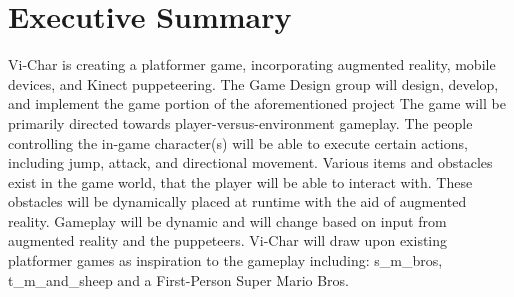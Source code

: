 \documentclass[10pt,letterpaper,oneside,english]{report}
\begin{document}
\section{Executive Summary}
\label{Executive Summary}
Vi-Char is creating a platformer game, incorporating augmented reality, mobile devices, and Kinect puppeteering. The Game Design group will design, develop, and implement the game portion of the aforementioned project
The game will be primarily directed towards player-versus-environment gameplay. The people controlling the in-game character(s) will be able to execute certain actions, including jump, attack, and directional movement. Various items and obstacles exist in the game world, that the player will be able to interact with. These obstacles will be dynamically placed at runtime with the aid of augmented reality. Gameplay will be dynamic and will change based on input from augmented reality and the \gls{puppeteers}.
Vi-Char will draw upon existing platformer games as inspiration to the gameplay including: \gls{s_m_bros}, \gls{t_m_and_sheep} and a First-Person Super Mario Bros.
\end{document}

